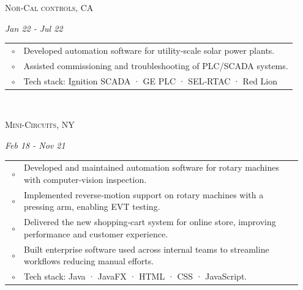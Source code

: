 \documentclass[a4paper]{article}
\newcommand{\SpaceBetweenJobs}{\vspace{0em}}
\newcommand{\PreviousWorkBullet}[1]{
  \noindent\hspace*{2.0em}$\circ$ & {\fontspec{Inter} #1} \\
}
\begin{document}
\SpaceBetweenJobs
	
%	
\noindent
\parbox[c][2em][c]{\linewidth}{   %
{\color{previousCompany}
{\Large \faBriefcase\; \textsc{Nor-Cal controls, CA}}}
}
{\color{previousRole}
\noindent{}
\hfill \emph{Jan 22 - Jul 22}
}
{\color{previousWork}
\begin{tabular}{r p{0.95\linewidth}}
\PreviousWorkBullet{ Developed automation software for utility‑scale solar power plants.	}
\PreviousWorkBullet{ Assisted commissioning and troubleshooting of PLC/SCADA systems.	}
\PreviousWorkBullet{ Tech stack: Ignition SCADA · GE PLC · SEL‑RTAC · Red Lion			}
\end{tabular}\\
}

\SpaceBetweenJobs

%
	
\noindent
\parbox[c][2em][c]{\linewidth}{   %
{\color{previousCompany}
{\Large \faBriefcase\; \textsc{Mini-Circuits, NY}}}
}
{\color{previousRole}
\noindent{}
\hfill \emph{Feb 18 - Nov 21}
}
{\color{previousWork}
\begin{tabular}{r p{0.95\linewidth}}
\PreviousWorkBullet{ Developed and maintained automation software for rotary machines with computer‑vision inspection.		}
\PreviousWorkBullet{ Implemented reverse‑motion support on rotary machines with a pressing arm, enabling EVT testing.		}
\PreviousWorkBullet{ Delivered the new shopping‑cart system for online store, improving performance and customer experience.	}
\PreviousWorkBullet{ Built enterprise software used across internal teams to streamline workflows reducing manual efforts.	}
\PreviousWorkBullet{ Tech stack: Java · JavaFX · HTML · CSS · JavaScript.													}
\end{tabular}\\
}

\SpaceBetweenJobs
\end{document}
